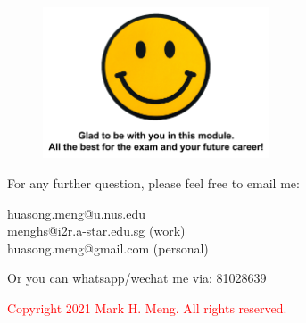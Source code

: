 \begin{frame}{}
	\begin{figure}
		\includegraphics[width=0.6\textwidth, trim=0 0 0 0, clip]{t5/images/final.png}
	\end{figure}
\end{frame}
\begin{frame}{}
	\centering  
	For any further question, please feel free to email me:\vspace{10pt}
	
	huasong.meng@u.nus.edu\\\vspace{3pt}
	menghs@i2r.a-star.edu.sg (work)\\\vspace{3pt}
	huasong.meng@gmail.com (personal)\vspace{10pt}
	
	Or you can whatsapp/wechat me via: 81028639 \vspace{20pt}
	
	\begin{tcolorbox}
		\begin{center}
			\textcolor{red}{Copyright 2021 Mark H. Meng. All rights reserved.}
		\end{center}
	\end{tcolorbox}
\end{frame}